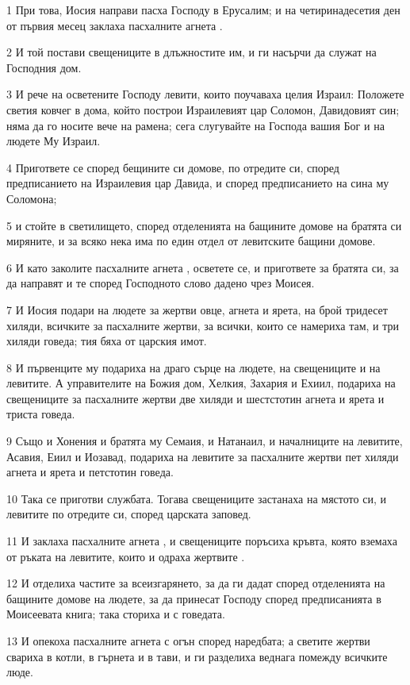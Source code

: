 \par 1 При това, Иосия направи пасха Господу в Ерусалим; и на четиринадесетия ден от първия месец заклаха пасхалните агнета .
\par 2 И той постави свещениците в длъжностите им, и ги насърчи да служат на Господния дом.
\par 3 И рече на осветените Господу левити, които поучаваха целия Израил: Положете светия ковчег в дома, който построи Израилевият цар Соломон, Давидовият син; няма да го носите вече на рамена; сега слугувайте на Господа вашия Бог и на людете Му Израил.
\par 4 Пригответе се според бещините си домове, по отредите си, според предписанието на Израилевия цар Давида, и според предписанието на сина му Соломона;
\par 5 и стойте в светилището, според отделенията на бащините домове на братята си миряните, и за всяко нека има по един отдел от левитските бащини домове.
\par 6 И като заколите пасхалните агнета , осветете се, и пригответе за братята си, за да направят и те според Господното слово дадено чрез Моисея.
\par 7 И Иосия подари на людете за жертви овце, агнета и ярета, на брой тридесет хиляди, всичките за пасхалните жертви, за всички, които се намериха там, и три хиляди говеда; тия бяха от царския имот.
\par 8 И първенците му подариха на драго сърце на людете, на свещениците и на левитите. А управителите на Божия дом, Хелкия, Захария и Ехиил, подариха на свещениците за пасхалните жертви две хиляди и шестстотин агнета и ярета и триста говеда.
\par 9 Също и Хонения и братята му Семаия, и Натанаил, и началниците на левитите, Асавия, Еиил и Иозавад, подариха на левитите за пасхалните жертви пет хиляди агнета и ярета и петстотин говеда.
\par 10 Така се приготви службата. Тогава свещениците застанаха на мястото си, и левитите по отредите си, според царската заповед.
\par 11 И заклаха пасхалните агнета , и свещениците поръсиха кръвта, която вземаха от ръката на левитите, които и одраха жертвите .
\par 12 И отделиха частите за всеизгарянето, за да ги дадат според отделенията на бащините домове на людете, за да принесат Господу според предписанията в Моисеевата книга; така сториха и с говедата.
\par 13 И опекоха пасхалните агнета с огън според наредбата; а светите жертви свариха в котли, в гърнета и в тави, и ги разделиха веднага помежду всичките люде.
